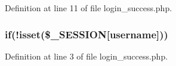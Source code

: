 Definition at line 11 of file login\+\_\+success.\+php.

\hypertarget{copy_2login__success_8php_a417be69c2182c77301b6d9d54792e7e5}{}
\subsubsection[{if}]{\setlength{\rightskip}{0pt plus 5cm}if(!isset(\$\+\_\+\+S\+E\+S\+S\+I\+O\+N\mbox{[}\textquotesingle{}username\textquotesingle{}\mbox{]}))}\label{copy_2login__success_8php_a417be69c2182c77301b6d9d54792e7e5}


Definition at line 3 of file login\+\_\+success.\+php.

